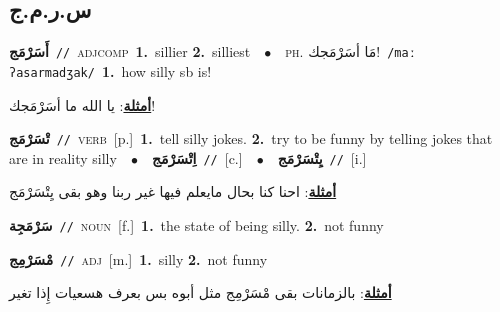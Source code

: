 \documentclass[10pt,a4paper,twoside]{article} %
\begin{document}
\begin{multicols}{2}
\vspace{-3mm}
\subsection*{\color{blue}\foreignlanguage{arabic}{س.ر.م.ج}\color{blue}{}} 

{\setlength\topsep{0pt}\textbf{\foreignlanguage{arabic}{أَسَرْمَج}}\ {\color{gray}\texttt{//}\color{black}}\ \textsc{adj\textunderscore comp}\ \textbf{1.}~sillier  \textbf{2.}~silliest\ \ $\bullet$\ \ \textsc{ph.} \color{gray} \foreignlanguage{arabic}{مَا أسَرْمَجك!}\color{black}\ {\color{gray}\texttt{/{\sffamily maː ʔasarmadʒak}/}\color{black}}\ \textbf{1.}~how silly sb is!\  \begin{flushright}\color{gray}\foreignlanguage{arabic}{\textbf{\underline{\foreignlanguage{arabic}{أمثلة}}}: يا الله ما أسَرْمَجك!}\end{flushright}\color{black}} \vspace{2mm}

{\setlength\topsep{0pt}\textbf{\foreignlanguage{arabic}{تْسَرْمَج}}\ {\color{gray}\texttt{//}\color{black}}\ \textsc{verb}\ [p.]\ \textbf{1.}~tell silly jokes.  \textbf{2.}~try to be funny by telling jokes that are in reality silly\ \ $\bullet$\ \ \setlength\topsep{0pt}\textbf{\foreignlanguage{arabic}{اِتْسَرْمَج}}\ {\color{gray}\texttt{//}\color{black}}\ [c.]\ \ $\bullet$\ \ \setlength\topsep{0pt}\textbf{\foreignlanguage{arabic}{يِتْسَرْمَج}}\ {\color{gray}\texttt{//}\color{black}}\ [i.]\  \begin{flushright}\color{gray}\foreignlanguage{arabic}{\textbf{\underline{\foreignlanguage{arabic}{أمثلة}}}: احنا كنا بحال مايعلم فيها غير ربنا وهو بقى يِتْسَرْمَج}\end{flushright}\color{black}} \vspace{2mm}

{\setlength\topsep{0pt}\textbf{\foreignlanguage{arabic}{سَرْمَجِة}}\ {\color{gray}\texttt{//}\color{black}}\ \textsc{noun}\ [f.]\ \textbf{1.}~the state of being silly.  \textbf{2.}~not funny\ } \vspace{2mm}

{\setlength\topsep{0pt}\textbf{\foreignlanguage{arabic}{مْسَرْمِج}}\ {\color{gray}\texttt{//}\color{black}}\ \textsc{adj}\ [m.]\ \textbf{1.}~silly  \textbf{2.}~not funny\  \begin{flushright}\color{gray}\foreignlanguage{arabic}{\textbf{\underline{\foreignlanguage{arabic}{أمثلة}}}: بالزمانات بقى مْسَرْمِج مثل أبوه بس بعرف هسعيات إِذا تغير}\end{flushright}\color{black}} \vspace{2mm}


\end{multicols}
\end{document}
